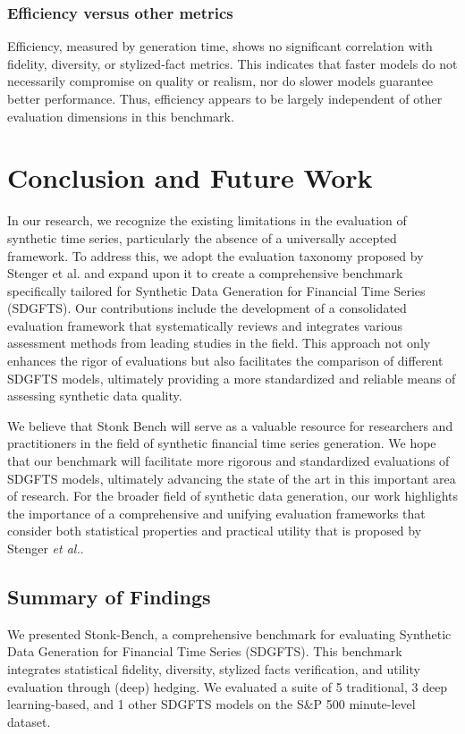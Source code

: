 \documentclass[sigconf]{acmart}
\begin{document}
    \subsubsection{Efficiency versus other metrics}
      Efficiency, measured by generation time, shows no significant
      correlation with fidelity, diversity, or stylized-fact metrics.
      This indicates that faster models do not necessarily compromise
      on quality or realism, nor do slower models guarantee better
      performance. Thus, efficiency appears to be largely independent
      of other evaluation dimensions in this benchmark.

\section{Conclusion and Future Work}
  In our research, we recognize the existing limitations in the
    evaluation of synthetic time series, particularly the absence of a
    universally accepted framework. To address this, we adopt the
    evaluation taxonomy proposed by Stenger et al. and expand upon it to
    create a comprehensive benchmark specifically tailored for Synthetic
    Data Generation for Financial Time Series (SDGFTS).
    Our contributions include the development of a consolidated evaluation
    framework that systematically reviews and integrates various
    assessment methods from leading studies in the field. This approach
    not only enhances the rigor of evaluations but also facilitates the
    comparison of different SDGFTS models, ultimately providing a more
    standardized and reliable means of assessing synthetic data quality.

  We believe that Stonk Bench will serve as a valuable resource for
    researchers and practitioners in the field of synthetic financial
    time series generation.
    We hope that our benchmark will facilitate more rigorous and
    standardized evaluations of SDGFTS models, ultimately advancing
    the state of the art in this important area of research.
    For the broader field of synthetic data generation, our work
    highlights the importance of a comprehensive and unifying
    evaluation frameworks that consider both statistical properties
    and practical utility that is proposed by Stenger \textit{et al.}.
  \subsection{Summary of Findings}
  We presented Stonk-Bench, a comprehensive benchmark for evaluating 
  Synthetic Data Generation for Financial Time Series (SDGFTS). This 
  benchmark integrates statistical fidelity, diversity, stylized facts 
  verification, and utility evaluation through (deep) hedging. We evaluated 
  a suite of 5 traditional, 3 deep learning-based, and 1 other SDGFTS 
  models on the S\&P 500 minute-level dataset.
\end{document}
